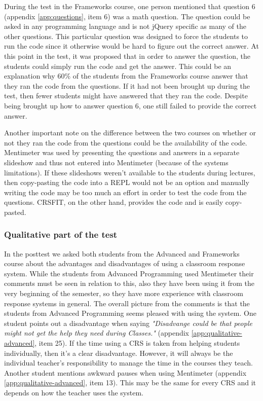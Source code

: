 During the test in the Frameworks course, one person mentioned that question 6 (appendix \ref{app:questions}, item 6) was a math question. The question could be asked in any programming language and is not jQuery specific as many of the other questions. This particular question was designed to force the students to run the code since it otherwise would be hard to figure out the correct answer. At this point in the test, it was proposed that in order to answer the question, the students could simply run the code and get the answer. This could be an explanation why 60\% of the students from the Frameworks course answer that they ran the code from the questions. If it had not been brought up during the test, then fewer students might have answered that they ran the code. Despite being brought up how to answer question 6, one still failed to provide the correct answer.

Another important note on the difference between the two courses on whether or not they ran the code from the questions could be the availability of the code. Mentimeter was used by presenting the questions and answers in a separate slideshow and thus not entered into Mentimeter (because of the systems limitations). If these slideshows weren't available to the students during lectures, then copy-pasting the code into a REPL would not be an option and manually writing the code may be too much an effort in order to test the code from the questions. CRSFIT, on the other hand, provides the code and is easily copy-pasted.


\subsubsection*{Qualitative part of the test}
In the posttest we asked both students from the Advanced and Frameworks course about the advantages and disadvantages of using a classroom response system. While the students from Advanced Programming used Mentimeter their comments must be seen in relation to this, also they have been using it from the very beginning of the semester, so they have more experience with classroom response systems in general. The overall picture from the comments is that the students from Advanced Programming seems pleased with using the system. One student points out a disadvantage when saying \emph{"Disadvange could be that people might not get the help they need during Classes."} (appendix \ref{app:qualitative-advanced}, item 25). If the time using a CRS is taken from helping students individually, then it's a clear disadvantage. However, it will always be the individual teacher's responsibility to manage the time in the courses they teach. Another student mentions awkward pauses when using Mentimeter (appendix \ref{app:qualitative-advanced}, item 13). This may be the same for every CRS and it depends on how the teacher uses the system.

